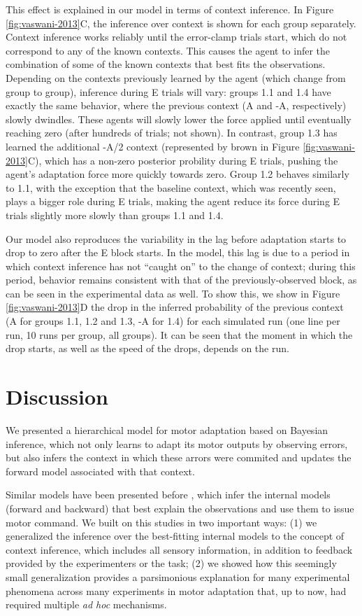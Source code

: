 \documentclass[a4paper,doc,floatsintext,natbib]{apa6}
\def \fref #1{Figure \ref{#1}}     %
\begin{document}
This effect is explained in our model in terms of context inference. In \fref{fig:vaswani-2013}C, the inference over context is shown for each group separately. Context inference works reliably until the error-clamp trials start, which do not correspond to any of the known contexts. This causes the agent to infer the combination of some of the known contexts that best fits the observations. Depending on the contexts previously learned by the agent (which change from group to group), inference during E trials will vary: groups 1.1 and 1.4 have exactly the same behavior, where the previous context (A and -A, respectively) slowly dwindles. These agents will slowly lower the force applied until eventually reaching zero (after hundreds of trials; not shown). In contrast, group 1.3 has learned the additional -A/2 context (represented by brown in \fref{fig:vaswani-2013}C), which has a non-zero posterior probility during E trials, pushing the agent's adaptation force more quickly towards zero. Group 1.2 behaves similarly to 1.1, with the exception that the baseline context, which was recently seen, plays a bigger role during E trials, making the agent reduce its force during E trials slightly more slowly than groups 1.1 and 1.4.


Our model also reproduces the variability in the lag before adaptation starts to drop to zero after the E block starts. In the model, this lag is due to a period in which context inference has not ``caught on'' to the change of context; during this period, behavior remains consistent with that of the previously-observed block, as can be seen in the experimental data as well. To show this, we show in \fref{fig:vaswani-2013}D the drop in the inferred probability of the previous context (A for groups 1.1, 1.2 and 1.3, -A for 1.4) for each simulated run (one line per run, 10 runs per group, all groups). It can be seen that the moment in which the drop starts, as well as the speed of the drops, depends on the run.

\section{Discussion}
We presented a hierarchical model for motor adaptation based on Bayesian inference, which not only learns to adapt its motor outputs by observing errors, but also infers the context in which these arrors were commited and updates the forward model associated with that context.

Similar models have been presented before \cite[e.g.][]{Wolpert_Multiple_1998,Baddeley_System_2003}, which infer the internal models (forward and backward) that best explain the observations and use them to issue motor command. We built on this studies in two important ways: (1) we generalized the inference over the best-fitting internal models to the concept of context inference, which includes all sensory information, in addition to feedback provided by the experimenters or the task; (2) we showed how this seemingly small generalization provides a parsimonious explanation for many experimental phenomena across many experiments in motor adaptation that, up to now, had required multiple \textit{ad hoc} mechanisms.
\end{document}

